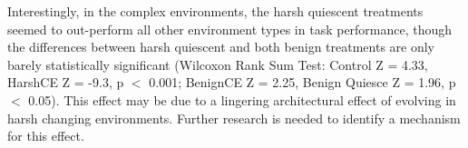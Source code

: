 \documentclass[PhD]{msu-thesis}
\begin{document}


Interestingly, in the complex environments, the harsh quiescent treatments %
seemed to out-perform all other environment types in task performance, though the differences between harsh quiescent and both benign treatments are only barely statistically significant (Wilcoxon Rank Sum Test: Control Z = 4.33, HarshCE Z = -9.3, p $<$ 0.001; BenignCE Z = 2.25, Benign Quiesce Z = 1.96, p $<$ 0.05). This effect may be due to a lingering architectural effect of evolving in harsh changing environments.
Further research is needed to identify a mechanism for this effect.
\end{document}
